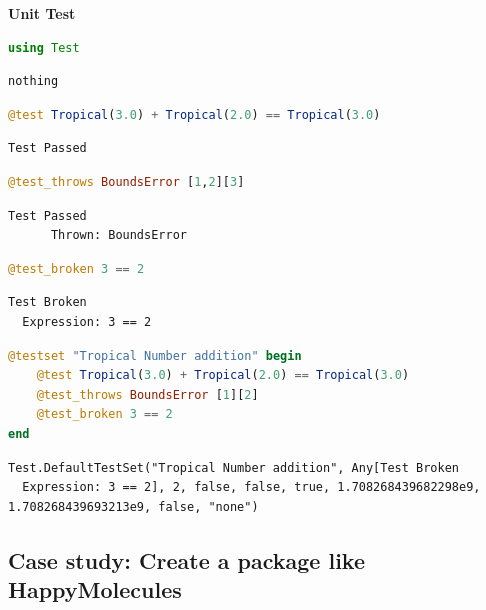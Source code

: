 \documentclass[
  notoc %
]{tufte-book}
\begin{document}
\textbf{Unit Test}

\begin{lstlisting}[language=Julia]
using Test
\end{lstlisting}

\begin{lstlisting}[language=Output]
nothing
\end{lstlisting}

\begin{lstlisting}[language=Julia]
@test Tropical(3.0) + Tropical(2.0) == Tropical(3.0)
\end{lstlisting}

\begin{lstlisting}[language=Output]
Test Passed
\end{lstlisting}

\begin{lstlisting}[language=Julia]
@test_throws BoundsError [1,2][3]
\end{lstlisting}

\begin{lstlisting}[language=Output]
Test Passed
      Thrown: BoundsError
\end{lstlisting}

\begin{lstlisting}[language=Julia]
@test_broken 3 == 2
\end{lstlisting}

\begin{lstlisting}[language=Output]
Test Broken
  Expression: 3 == 2
\end{lstlisting}

\begin{lstlisting}[language=Julia]
@testset "Tropical Number addition" begin
    @test Tropical(3.0) + Tropical(2.0) == Tropical(3.0)
    @test_throws BoundsError [1][2]
    @test_broken 3 == 2
end
\end{lstlisting}

\begin{lstlisting}[language=Output]
Test.DefaultTestSet("Tropical Number addition", Any[Test Broken
  Expression: 3 == 2], 2, false, false, true, 1.708268439682298e9, 1.708268439693213e9, false, "none")
\end{lstlisting}

\hypertarget{case-study-create-a-package-like-happymolecules}{%
\subsection{Case study: Create a package like
HappyMolecules}\label{case-study-create-a-package-like-happymolecules}}
\end{document}
